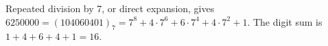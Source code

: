Repeated division by 7, or direct expansion, gives $6250000=(104060401)_7=7^8+4\cdot7^6+6\cdot7^4+4\cdot7^2+1$. The digit sum is $1+4+6+4+1=\boxed{16}$.
